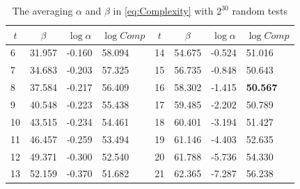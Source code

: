 \begin{table}[htbp]
  \centering
  \caption{The averaging $\alpha$ and $\beta$ in \eqref{eq:Complexity} with $2^{30}$ random tests}\label{tab:ZhangAlphaAndBeta}
    \begin{tabular}{|l|l|l|l|l|l|l|l|}
    \hline
    \multicolumn{1}{|c|}{$t$} & \multicolumn{1}{c|}{$\beta$} & \multicolumn{1}{c|}{$\log\alpha$} & \multicolumn{1}{c|}{$\log Comp$} & \multicolumn{1}{c|}{$t$} & \multicolumn{1}{c|}{$\beta$} & \multicolumn{1}{c|}{$\log\alpha$} & \multicolumn{1}{c|}{$\log Comp$} \\
    \hline

    6    & 31.957 & -0.160 & 58.094 & 14    & 54.675 & -0.524 &  51.016\\
    \hline
    7    & 34.683 & -0.203 & 57.325 & 15    & 56.735 & -0.848 &  50.643\\
    \hline
    8    & 37.584 & -0.217 & 56.409 & 16    & 58.302 & -1.415 &  \textbf{50.567}\\
    \hline
    9    &  40.548 & -0.223 & 55.438 & 17    & 59.485 & -2.202 &  50.789\\
    \hline
    10    & 43.515 & -0.234 & 54.461 & 18    & 60.401 & -3.194 &  51.427\\
    \hline
    11    & 46.457 & -0.259 & 53.494 & 19    & 61.146 & -4.403 &  52.635\\
    \hline
    12    & 49.371 & -0.300 & 52.540 & 20    & 61.788 & -5.736 &  54.330\\
    \hline
    13    & 52.159 & -0.370 & 51.682 & 21    & 62.365 & -7.287 &  56.238\\
    \hline
    \end{tabular}%
\end{table}%


